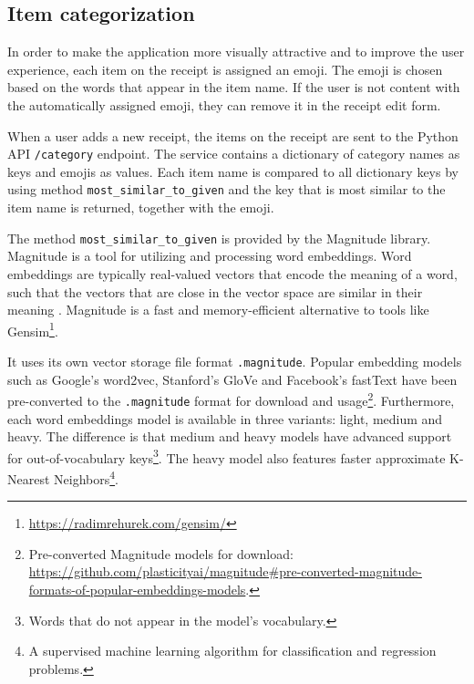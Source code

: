 \documentclass[
  digital, %
  table,   %
  oneside, %
  lof,     %
  lot,     %
]{fithesis3}
\DeclareRobustCommand{\thinskip}{\hskip 0.16667em\relax}
\def\emdash{---}
\def\dosh#1#2{\unskip#1\thinskip#2\thinskip\ignorespaces}
\def\Dash{\dosh\nobreak\emdash}
\begin{document}

\subsection{Item categorization}
In order to make the application more visually attractive and to improve the user experience, each item on the receipt is assigned an emoji. The emoji is chosen based on the words that appear in the item name. If the user is not content with the automatically assigned emoji, they can remove it in the receipt edit form.

When a user adds a new receipt, the items on the receipt are sent to the Python API \texttt{/category} endpoint. The service contains a dictionary of category names as keys and emojis as values. Each item name is compared to all dictionary keys by using method \texttt{most\_similar\_to\_given} and the key that is most similar to the item name is returned, together with the emoji.

The method \texttt{most\_similar\_to\_given} is provided by the Magnitude library\cite{PatelEtal2018Magnitude}. Magnitude is a tool for utilizing and processing word embeddings. Word embeddings are typically real-valued vectors that encode the meaning of a word, such that the vectors that are close in the vector space are similar in their meaning \cite{Jurafsky2020Speech}. Magnitude is a fast and memory-efficient alternative to tools like Gensim\footnote{\url{https://radimrehurek.com/gensim/}}.

It uses its own vector storage file format \texttt{.magnitude}.
Popular embedding models such as Google's word2vec, Stanford's GloVe and Facebook's fastText have been pre-converted to the \texttt{.magnitude} format for download and usage\footnote{Pre-converted Magnitude models for download: \url{https://github.com/plasticityai/magnitude\#pre-converted-magnitude-formats-of-popular-embeddings-models}.}. Furthermore, each word embeddings model is available in three variants: light, medium and heavy. The difference is that medium and heavy models have advanced support for out-of-vocabulary keys\footnote{Words that do not appear in the model's vocabulary.}. The heavy model also features faster approximate K-Nearest Neighbors\footnote{A supervised machine learning algorithm for classification and regression problems.}.
\end{document}
